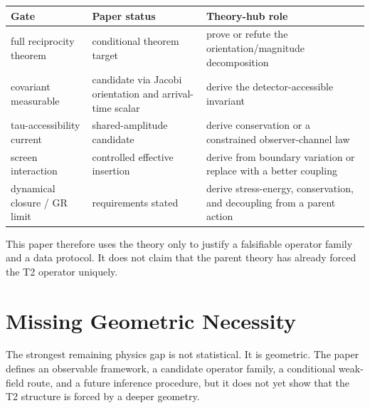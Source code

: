 \documentclass[11pt]{article}
\newcounter{none} %
\begin{document}
{\def\LTcaptype{none} %
\begin{longtable}[]{@{}
  >{\raggedright\arraybackslash}p{}
  >{\raggedright\arraybackslash}p{}
  >{\raggedright\arraybackslash}p{}@{}}
\toprule\noalign{}
\begin{minipage}[b]{\linewidth}\raggedright
Gate
\end{minipage} & \begin{minipage}[b]{\linewidth}\raggedright
Paper status
\end{minipage} & \begin{minipage}[b]{\linewidth}\raggedright
Theory-hub role
\end{minipage} \\
\midrule\noalign{}
\endhead
\bottomrule\noalign{}
\endlastfoot
full reciprocity theorem & conditional theorem target & prove or refute
the orientation/magnitude decomposition \\
covariant measurable & candidate via Jacobi orientation and arrival-time
scalar & derive the detector-accessible invariant \\
tau-accessibility current & shared-amplitude candidate & derive
conservation or a constrained observer-channel law \\
screen interaction & controlled effective insertion & derive from
boundary variation or replace with a better coupling \\
dynamical closure / GR limit & requirements stated & derive
stress-energy, conservation, and decoupling from a parent action \\
\end{longtable}
}

This paper therefore uses the theory only to justify a falsifiable
operator family and a data protocol. It does not claim that the parent
theory has already forced the T2 operator uniquely.

\section{Missing Geometric
Necessity}\label{missing-geometric-necessity}

The strongest remaining physics gap is not statistical. It is geometric.
The paper defines an observable framework, a candidate operator family,
a conditional weak-field route, and a future inference procedure, but it
does not yet show that the T2 structure is forced by a deeper geometry.
\end{document}
